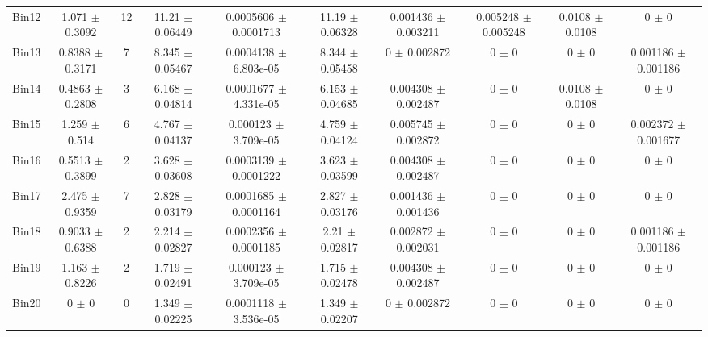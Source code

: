 \begin{tabular}{@{\extracolsep{4pt}}lccccccccc@{}}
     Bin12 & 1.071 $\pm$ 0.3092 & 12 & 11.21 $\pm$ 0.06449 & 0.0005606 $\pm$ 0.0001713 & 11.19 $\pm$ 0.06328 & 0.001436 $\pm$ 0.003211 & 0.005248 $\pm$ 0.005248 & 0.0108 $\pm$ 0.0108 & 0 $\pm$ 0 \\ 
     Bin13 & 0.8388 $\pm$ 0.3171 & 7 & 8.345 $\pm$ 0.05467 & 0.0004138 $\pm$ 6.803e-05 & 8.344 $\pm$ 0.05458 & 0 $\pm$ 0.002872 & 0 $\pm$ 0 & 0 $\pm$ 0 & 0.001186 $\pm$ 0.001186 \\ 
     Bin14 & 0.4863 $\pm$ 0.2808 & 3 & 6.168 $\pm$ 0.04814 & 0.0001677 $\pm$ 4.331e-05 & 6.153 $\pm$ 0.04685 & 0.004308 $\pm$ 0.002487 & 0 $\pm$ 0 & 0.0108 $\pm$ 0.0108 & 0 $\pm$ 0 \\ 
     Bin15 & 1.259 $\pm$ 0.514 & 6 & 4.767 $\pm$ 0.04137 & 0.000123 $\pm$ 3.709e-05 & 4.759 $\pm$ 0.04124 & 0.005745 $\pm$ 0.002872 & 0 $\pm$ 0 & 0 $\pm$ 0 & 0.002372 $\pm$ 0.001677 \\ 
     Bin16 & 0.5513 $\pm$ 0.3899 & 2 & 3.628 $\pm$ 0.03608 & 0.0003139 $\pm$ 0.0001222 & 3.623 $\pm$ 0.03599 & 0.004308 $\pm$ 0.002487 & 0 $\pm$ 0 & 0 $\pm$ 0 & 0 $\pm$ 0 \\ 
     Bin17 & 2.475 $\pm$ 0.9359 & 7 & 2.828 $\pm$ 0.03179 & 0.0001685 $\pm$ 0.0001164 & 2.827 $\pm$ 0.03176 & 0.001436 $\pm$ 0.001436 & 0 $\pm$ 0 & 0 $\pm$ 0 & 0 $\pm$ 0 \\ 
     Bin18 & 0.9033 $\pm$ 0.6388 & 2 & 2.214 $\pm$ 0.02827 & 0.0002356 $\pm$ 0.0001185 & 2.21 $\pm$ 0.02817 & 0.002872 $\pm$ 0.002031 & 0 $\pm$ 0 & 0 $\pm$ 0 & 0.001186 $\pm$ 0.001186 \\ 
     Bin19 & 1.163 $\pm$ 0.8226 & 2 & 1.719 $\pm$ 0.02491 & 0.000123 $\pm$ 3.709e-05 & 1.715 $\pm$ 0.02478 & 0.004308 $\pm$ 0.002487 & 0 $\pm$ 0 & 0 $\pm$ 0 & 0 $\pm$ 0 \\ 
     Bin20 & 0 $\pm$ 0 & 0 & 1.349 $\pm$ 0.02225 & 0.0001118 $\pm$ 3.536e-05 & 1.349 $\pm$ 0.02207 & 0 $\pm$ 0.002872 & 0 $\pm$ 0 & 0 $\pm$ 0 & 0 $\pm$ 0 \\ 
\hline\hline
  \end{tabular}
